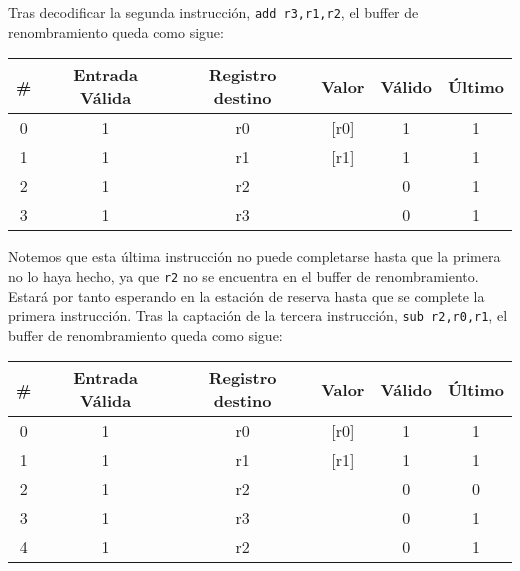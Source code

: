 \begin{ejercicio}
    Tras decodificar la segunda instrucción, \verb|add r3,r1,r2|, el buffer de renombramiento queda como sigue:
    \begin{center}
        \scriptsize
        \begin{tabular}{|c|c|c|c|c|c|}
            \hline
            \# & Entrada Válida & Registro destino & Valor & Válido & Último \\
            \hline
            0 & 1 & r0 & [r0] & 1 & 1 \\
            1 & 1 & r1 & [r1] & 1 & 1 \\
            2 & 1 & r2 &  & 0 & 1 \\
            3 & 1 & r3 &  & 0 & 1 \\
            \hline
        \end{tabular}
    \end{center}

    Notemos que esta última instrucción no puede completarse hasta que la primera no lo haya hecho, ya que \verb|r2| no se encuentra en el buffer de renombramiento.
    Estará por tanto esperando en la estación de reserva hasta que se complete la primera instrucción. Tras la captación de la tercera instrucción, \verb|sub r2,r0,r1|, el buffer de renombramiento queda como sigue:
    \begin{center}
        \scriptsize
        \begin{tabular}{|c|c|c|c|c|c|}
            \hline
            \# & Entrada Válida & Registro destino & Valor & Válido & Último \\
            \hline
            0 & 1 & r0 & [r0] & 1 & 1 \\
            1 & 1 & r1 & [r1] & 1 & 1 \\
            2 & 1 & r2 &  & 0 & 0 \\
            3 & 1 & r3 &  & 0 & 1 \\
            4 & 1 & r2 &  & 0 & 1 \\
            \hline
        \end{tabular}
    \end{center}


\end{ejercicio}
